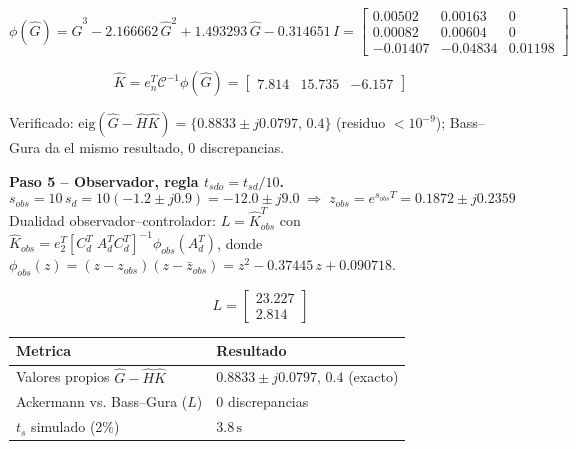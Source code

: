 \documentclass[11pt]{article}
\begin{document}
\begin{equation}
\phi(\hat G)=\hat G^3-2.166662\,\hat G^2+1.493293\,\hat G-0.314651\,I
=\begin{bmatrix}0.00502&0.00163&0\\0.00082&0.00604&0\\-0.01407&-0.04834&0.01198\end{bmatrix}
\end{equation}

\begin{resultbox}
\begin{equation}
\hat K=e_n^T\mathcal C^{-1}\phi(\hat G)=\begin{bmatrix}7.814&15.735&-6.157\end{bmatrix}
\end{equation}
\end{resultbox}
Verificado: $\mathrm{eig}(\hat G-\hat H\hat K)=\{0.8833{\pm}j0.0797,\,0.4\}$ (residuo
$<10^{-9}$); Bass--Gura da el mismo resultado, 0 discrepancias.

\textbf{Paso 5 -- Observador, regla $t_{sdo}=t_{sd}/10$.}
\begin{equation}
s_{obs}=10\,s_d=10(-1.2\pm j0.9)=-12.0\pm j9.0\;\Rightarrow\;
z_{obs}=e^{s_{obs}T}=0.1872\pm j0.2359
\end{equation}
Dualidad observador--controlador: $L=\hat K_{obs}^T$ con
$\hat K_{obs}=e_2^T[C_d^T\;A_d^TC_d^T]^{-1}\phi_{obs}(A_d^T)$, donde
$\phi_{obs}(z)=(z-z_{obs})(z-\bar z_{obs})=z^2-0.37445\,z+0.090718$.
\begin{resultbox}
\begin{equation}
L=\begin{bmatrix}23.227\\2.814\end{bmatrix}
\end{equation}
\end{resultbox}

\begin{center}
\begin{tabular}{@{}ll@{}}
\toprule
Metrica & Resultado \\
\midrule
Valores propios $\hat G-\hat H\hat K$ & $0.8833\pm j0.0797,\,0.4$ (exacto) \\
Ackermann vs. Bass--Gura ($L$) & 0 discrepancias \\
$t_s$ simulado (2\%) & $3.8\,\mathrm s$ \\
\bottomrule
\end{tabular}
\end{center}
\end{document}
